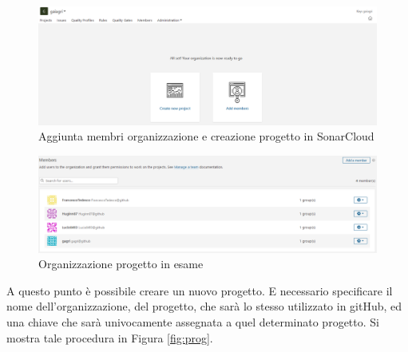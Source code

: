\begin{figure}[htbp]
	\centering
	\includegraphics[scale=0.3, trim = 0cm 0cm 0cm 0cm, clip=true]{figSonarCloud/aggiuntaMembri.PNG}
	\caption{Aggiunta membri organizzazione e creazione progetto in SonarCloud}
	\label{fig:membri}
\end{figure}

\begin{figure}[htbp]
	\centering
	\includegraphics[scale=0.3, trim = 0cm 0cm 0cm 0cm, clip=true]{figSonarCloud/nostraOrganizzazione.PNG}
	\caption{Organizzazione progetto in esame}
	\label{fig:nostraOrg}
\end{figure}
A questo punto è possibile creare un nuovo progetto. E necessario specificare il nome dell'organizzazione, del progetto, che sarà lo stesso utilizzato in gitHub, ed una chiave che sarà univocamente assegnata a quel determinato progetto. Si mostra tale procedura in Figura \ref{fig:prog}.

